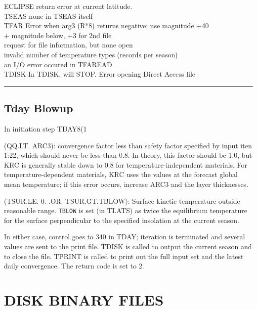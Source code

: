\documentclass{article}
\newcommand{\nv}{\texttt}  %
\begin{document}
\begin{table}
\begin{tabbing}
    \> ECLIPSE return error at current latitude. \\
TSEAS \>  \> none in TSEAS itself \\
TFAR \> \> Error when arg3 (R*8) returns negative: use magnitude +40 \\
  + \>  magnitude below, +3 for 2nd file \\
     \>   request for file information, but none open \\
     \>   invalid number of temperature types (records per season) \\
     \>   an I/O error occured in TFAREAD \\ 
TDISK \> \> In TDISK, will STOP. Error opening Direct Access file \\
\end{tabbing} 
\rule[.25in]{7.in}{.01in}
\vspace{-.1in}
\end{table}

\subsection{Tday Blowup} %
In initiation step TDAY8(1

 (QQ.LT. ARC3): convergence factor less than safety factor specified by input
iten 1:22, which should never be less than 0.8. In theory, this factor should be
1.0, but KRC is generally stable down to 0.8 for temperature-independent
materials. For temperature-dependent materials, KRC uses the values at the
forecast global mean temperature; if this error occurs, increase ARC3 and the
layer thicknesses.

 (TSUR.LE. 0. .OR. TSUR.GT.TBLOW): Surface kinetic temperature outside
reasonable range. \nv{TBLOW} is set (in TLATS) as twice the equilibrium
temperature for the surface perpendicular to the specified insolation at the
current season.

In either case, control goes to 340 in TDAY; iteration is terminated and several
values are sent to the print file. TDISK is called to output the current season
and to close the file. TPRINT is called to print out the full input set and the
latest daily convergence. The return code is set to 2.

\section{DISK BINARY FILES \label{dbf} } %
\end{document}
